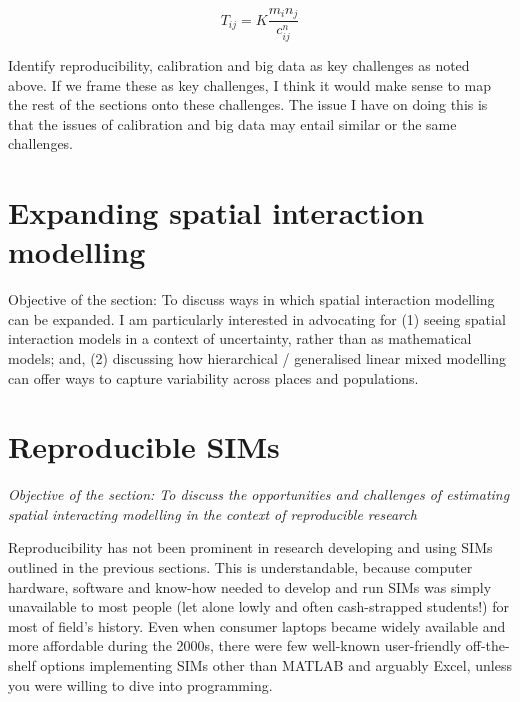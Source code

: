 \documentclass[11pt,letterpaper]{article}
\begin{document}
\[
T_{i j}=K \frac{m_{i} n_{j}}{c_{i j}^{n}}
\]

Identify reproducibility, calibration and big data as key challenges as noted above.
If we frame these as key challenges, I think it would make sense to map the rest of the sections onto these challenges.
The issue I have on doing this is that the issues of calibration and big data may entail similar or the same challenges.

\hypertarget{expanding-spatial-interaction-modelling}{%
\section{Expanding spatial interaction modelling}\label{expanding-spatial-interaction-modelling}}

Objective of the section: To discuss ways in which spatial interaction modelling can be expanded.
I am particularly interested in advocating for (1) seeing spatial interaction models in a context of uncertainty, rather than as mathematical models; and, (2) discussing how hierarchical / generalised linear mixed modelling can offer ways to capture variability across places and populations.

\hypertarget{reproducible-sims}{%
\section{\texorpdfstring{Reproducible SIMs }{Reproducible SIMs }}\label{reproducible-sims}}

\emph{Objective of the section: To discuss the opportunities and challenges of estimating spatial interacting modelling in the context of reproducible research}

Reproducibility has not been prominent in research developing and using SIMs outlined in the previous sections.
This is understandable, because computer hardware, software and know-how needed to develop and run SIMs was simply unavailable to most people (let alone lowly and often cash-strapped students!) for most of field's history.
Even when consumer laptops became widely available and more affordable during the 2000s, there were few well-known user-friendly off-the-shelf options implementing SIMs other than MATLAB and arguably Excel, unless you were willing to dive into programming.
\end{document}
